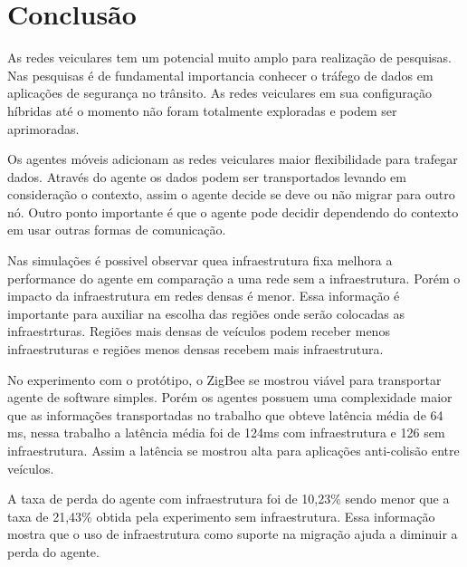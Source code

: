 \section{Conclusão}

As redes veiculares tem um potencial muito amplo para realização de pesquisas. Nas pesquisas é de fundamental importancia conhecer o tráfego de dados em aplicações de segurança no trânsito. As redes veiculares em sua configuração híbridas até o momento não foram totalmente exploradas e podem ser aprimoradas.

Os agentes móveis adicionam as redes veiculares maior flexibilidade para trafegar dados. Através do agente os dados podem ser transportados levando em consideração o contexto, assim o agente decide se deve ou não migrar para outro nó. Outro ponto importante é que o agente pode decidir dependendo do contexto em usar outras formas de comunicação. 

Nas simulações é possivel observar quea infraestrutura fixa melhora a performance do agente em comparação a uma rede sem a infraestrutura. Porém o impacto da infraestrutura em redes densas é menor. Essa informação é importante para auxiliar na escolha das regiões onde serão colocadas as infraestrturas. Regiões mais densas de veículos podem receber menos infraestruturas e regiões menos densas recebem mais infraestrutura. 

No experimento com o protótipo, o ZigBee se mostrou viável para transportar agente de software simples. Porém os agentes possuem uma complexidade maior que as informações transportadas no trabalho \cite{santanaMestrado:2014} que obteve latência média de 64 ms, nessa trabalho a latência média foi de 124ms com infraestrutura e 126 sem infraestrutura. Assim a latência se mostrou alta para aplicações anti-colisão entre veículos.

A taxa de perda do agente com infraestrutura foi de 10,23\% sendo menor que a taxa de 21,43\% obtida pela experimento sem infraestrutura. Essa informação mostra que o uso de infraestrutura como suporte na migração ajuda a diminuir a perda do agente.
